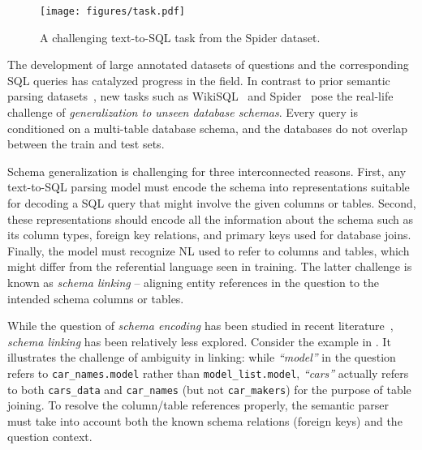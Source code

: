 \documentclass[11pt,a4paper,final]{article}
\begin{document}
\begin{figure*}
    \centering
    \texttt{[image: figures/task.pdf]}
\caption{
        A challenging text-to-SQL task from the Spider dataset.
    }\label{fig:intro:example}
    \vspace{-\baselineskip}
\end{figure*}

The development of large annotated datasets of questions and the corresponding SQL queries has catalyzed
progress in the field.
In contrast to prior semantic parsing datasets~\citep{finegan-dollakImprovingTexttoSQLEvaluation2018}, new tasks such as
WikiSQL~\citep{zhongSeq2SQLGeneratingStructured2017} and Spider~\citep{data-spider} pose the real-life challenge of
\emph{generalization to unseen database schemas}.
Every query is conditioned on a multi-table database schema, and the databases do not overlap between the train and test
sets.






Schema generalization is challenging for three interconnected reasons.
First, any text-to-SQL parsing model must encode the schema into
representations suitable for decoding a SQL query that might involve the given columns or tables.
Second, these representations should encode all the information about the schema such as its column types, foreign
key relations, and primary keys used for database joins.
Finally, the model must recognize NL used to refer to columns and tables, which might differ from
the referential language seen in training.
The latter challenge is known as \emph{schema linking} -- aligning entity references in the question to the
intended schema columns or tables.

While the question of \emph{schema encoding} has been studied in recent literature~\citep{gnnsql}, \emph{schema linking}
has been relatively less explored.
Consider the example in .
It illustrates the challenge of ambiguity in linking:
while \emph{``model''} in the question refers to \texttt{car\_names.model} rather than \texttt{model\_list.model},
\emph{``cars''} actually refers to both \texttt{cars\_data} and \texttt{car\_names} (but not \texttt{car\_makers}) for
the purpose of table joining.
To resolve the column/table references properly, the semantic parser must take into account both the known schema
relations (\eg foreign keys) and the question context.
\end{document}
